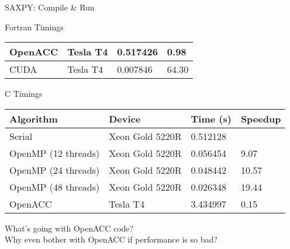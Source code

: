 \documentclass[10pt,t]{beamer}
\begin{document}
\begin{frame}{SAXPY: Compile \& Run}
\begin{exampleblock}{Fortran Timings}
{\begin{center}
\begin{tabular}{|bbbb|}
         \hline
         OpenACC & Tesla T4 & 0.517426 & 0.98  \\ %
         \hline
         CUDA & Tesla T4 & 0.007846 & 64.30 \\
        \hline
      \end{tabular}
    \end{center}
    }
  \end{exampleblock}
  \begin{exampleblock}{C Timings}
    {\scriptsize
    \begin{center}
      \begin{tabular}{|bbbb|}
        \hline
        \rowcolor{lublue}Algorithm & Device & Time (s) & Speedup \\
        \hline
         Serial & Xeon Gold 5220R & 0.512128 & \\
         \hline
         OpenMP (12 threads) & Xeon Gold 5220R & 0.056454 &  9.07 \\
         OpenMP (24 threads) & Xeon Gold 5220R & 0.048442 & 10.57 \\
         OpenMP (48 threads) & Xeon Gold 5220R & 0.026348 & 19.44 \\
         \hline
         OpenACC & Tesla T4 & 3.434997 & 0.15 \\ %
        \hline
      \end{tabular}
    \end{center}
    }
  \end{exampleblock}
  What's going with OpenACC code? \\
  Why even bother with OpenACC if performance is so bad?
 \end{frame}
\end{document}
